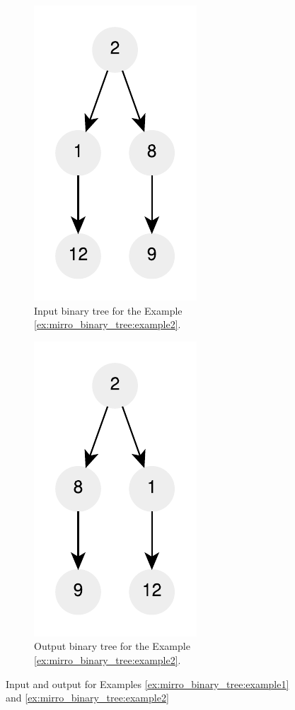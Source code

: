 \begin{figure}
\begin{subfigure}[b]{0.4\textwidth}
	   \label{fig:mirro_binary_tree:example1_1}
	\end{subfigure}
	\centering
	\begin{subfigure}[b]{0.4\textwidth}
	   \includegraphics[]{sources/mirror_binary_tree/images/example2}
	   \caption{Input binary tree for the Example \ref{ex:mirro_binary_tree:example2}.}
	   \label{fig:mirro_binary_tree:example2}
	\end{subfigure}
	\hfill
	\begin{subfigure}[b]{0.4\textwidth}
	   \includegraphics[]{sources/mirror_binary_tree/images/example2_1}
	   \caption{Output binary tree for the Example \ref{ex:mirro_binary_tree:example2}.}
	   \label{fig:mirro_binary_tree:example2_1}
	\end{subfigure}
	\centering

	 \caption[]{Input and output for Examples \ref{ex:mirro_binary_tree:example1} and \ref{ex:mirro_binary_tree:example2}}
\end{figure}



